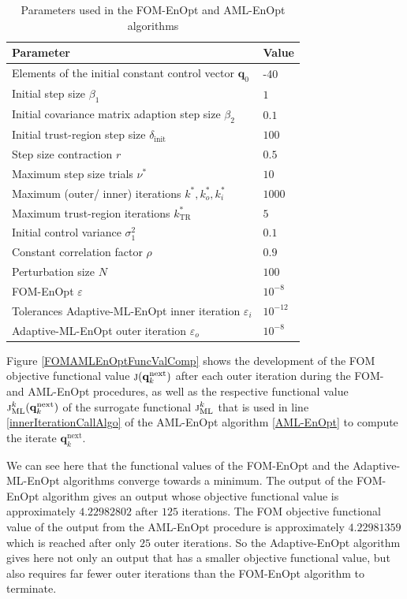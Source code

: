 \begin{table}[h]
\caption{\label{FOMAMLEnOptParameters}Parameters used in the FOM-EnOpt and AML-EnOpt algorithms}
\centering
\begin{tabular}{ll}
\hline
Parameter & Value\\
\hline
Elements of the initial constant control vector $\mathbf{q}_0$ & -40\\
Initial step size $\beta_1$ & $1$\\
Initial covariance matrix adaption step size $\beta_2$ & $0.1$\\
Initial trust-region step size $\delta_\mathrm{init}$ & $100$\\
Step size contraction $r$ & $0.5$\\
Maximum step size trials $\nu^*$ & $10$\\
Maximum (outer/ inner) iterations $k^*, k^*_o, k^*_i$ & $1000$\\
Maximum trust-region iterations $k^*_\mathrm{TR}$ & $5$\\
Initial control variance $\sigma^2_1$ & $0.1$\\
Constant correlation factor $\rho$ & $0.9$\\
Perturbation size $N$ & $100$\\
FOM-EnOpt $\varepsilon$ & $10^{-8}$\\
Tolerances Adaptive-ML-EnOpt inner iteration $\varepsilon_i$ & $10^{-12}$\\
Adaptive-ML-EnOpt outer iteration $\varepsilon_o$ & $10^{-8}$\\
\hline
\end{tabular}
\end{table}

Figure \ref{FOMAMLEnOptFuncValComp} shows the development of the FOM objective functional value $\Call{j}{\mathbf{q}^\mathrm{next}_k}$ after each outer iteration during the FOM- and AML-EnOpt procedures, as well as the respective functional value $\Call{j$^k_\mathrm{ML}$}{\mathbf{q}^\mathrm{next}_k}$ of the surrogate functional $\textproc{j$_\mathrm{ML}^k$}$ that is used in line \ref{innerIterationCallAlgo} of the AML-EnOpt algorithm \ref{AML-EnOpt} to compute the iterate $\mathbf{q}^\mathrm{next}_k$.%

We can see here that the functional values of the FOM-EnOpt and the Adaptive-ML-EnOpt algorithms converge towards a minimum. The output of the FOM-EnOpt algorithm gives an output whose objective functional value is approximately $4.22982802$ after $125$ iterations. The FOM objective functional value of the output from the AML-EnOpt procedure is approximately $4.22981359$ which is reached after only $25$ outer iterations. So the Adaptive-EnOpt algorithm gives here not only an output that has a smaller objective functional value, but also requires far fewer outer iterations than the FOM-EnOpt algorithm to terminate.\\

